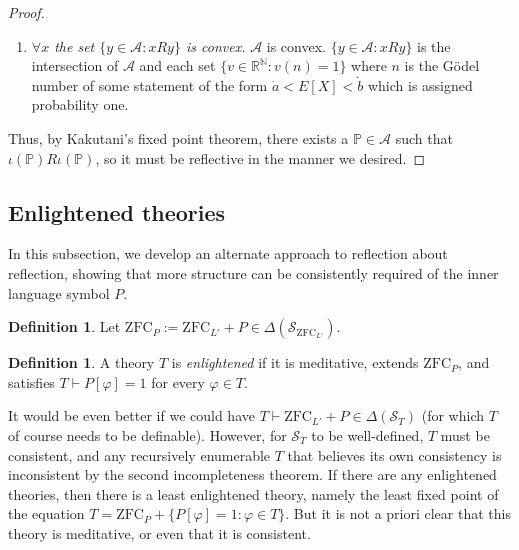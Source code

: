 \documentclass[12pt]{article}
\newcommand{\PP}{\mathbb{P}}
\newcommand{\vp}{\varphi}
\newcommand{\RR}{\mathbb{R}}
\newcommand{\NN}{\mathbb{N}}
\newcommand{\zfc}{\mathrm{ZFC}}
\newcommand{\zfcl}{{\zfc_{\cL}}}
\newcommand{\zfcp}{{\zfc_P}}
\newcommand{\cA}{\mathcal{A}}
\newcommand{\cL}{L'}
\newcommand{\cS}{\mathcal{S}}
\theoremstyle{plain}
\theoremstyle{definition}
\newtheorem{definition}[theorem]{Definition}
\theoremstyle{remark}
\begin{document}
\begin{proof}
\begin{enumerate}
\item \emph{$\forall x$ the set $\{y \in \mathcal{A}: xRy\}$ is convex.} $\cA$ is convex. $\{y\in\cA:xRy\}$ is the intersection of $\cA$ and each set $\{v\in\RR^\NN : v(n) = 1\}$ where $n$ is the G\"odel number of some statement of the form $\dot a < E[X]<\dot b$ which is assigned probability one.
\end{enumerate}
Thus, by Kakutani's fixed point theorem, there exists a $\PP\in\cA$ such that 
$\iota(\PP)R\iota(\PP)$, so it must be reflective in the manner we desired.

\end{proof}
\subsection{Enlightened theories}
In this subsection, we develop an alternate approach to reflection about reflection, showing that more structure can be consistently required of the inner language symbol $P$.
\begin{definition}
Let $\zfcp := \zfcl + P\in\Delta(\cS_\zfcl)$.
\end{definition}
\begin{definition}
A theory $T$ is \emph{enlightened} if it is meditative, extends $\zfcp$, and satisfies $T\vdash P[\vp] = 1$ for every $\vp\in T$.
\end{definition}
It would be even better if we could have $T\vdash\zfcl + P\in\Delta(\cS_T)$ (for which $T$ of course needs to be definable). However, for $\cS_T$ to be well-defined, $T$ must be consistent, and any recursively enumerable $T$ that believes its own consistency is inconsistent by the second incompleteness theorem.
If there are any enlightened theories, then there is a least enlightened theory, namely the least fixed point of the equation $T = \zfcp + \{P[\vp] = 1 : \vp\in T\}$. But it is not a priori clear that this theory is meditative, or even that it is consistent. 
\end{document}
